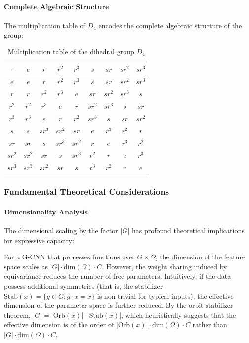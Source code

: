 \paragraph{Complete Algebraic Structure}

The multiplication table of $D_4$ encodes the complete algebraic structure of the group:

\begin{table}[h]
\centering
\small
\begin{tabular}{|c|c|c|c|c|c|c|c|c|}
\hline
$\cdot$ & $e$ & $r$ & $r^2$ & $r^3$ & $s$ & $sr$ & $sr^2$ & $sr^3$ \\
\hline
$e$ & $e$ & $r$ & $r^2$ & $r^3$ & $s$ & $sr$ & $sr^2$ & $sr^3$ \\
$r$ & $r$ & $r^2$ & $r^3$ & $e$ & $sr$ & $sr^2$ & $sr^3$ & $s$ \\
$r^2$ & $r^2$ & $r^3$ & $e$ & $r$ & $sr^2$ & $sr^3$ & $s$ & $sr$ \\
$r^3$ & $r^3$ & $e$ & $r$ & $r^2$ & $sr^3$ & $s$ & $sr$ & $sr^2$ \\
$s$ & $s$ & $sr^3$ & $sr^2$ & $sr$ & $e$ & $r^3$ & $r^2$ & $r$ \\
$sr$ & $sr$ & $s$ & $sr^3$ & $sr^2$ & $r$ & $e$ & $r^3$ & $r^2$ \\
$sr^2$ & $sr^2$ & $sr$ & $s$ & $sr^3$ & $r^2$ & $r$ & $e$ & $r^3$ \\
$sr^3$ & $sr^3$ & $sr^2$ & $sr$ & $s$ & $r^3$ & $r^2$ & $r$ & $e$ \\
\hline
\end{tabular}
\caption{Multiplication table of the dihedral group $D_4$}
\label{tab:d4_multiplication}
\end{table}

\subsubsection{Fundamental Theoretical Considerations}

\paragraph{Dimensionality Analysis}

The dimensional scaling by the factor $|G|$ has profound theoretical implications for expressive capacity:

\begin{remark}\label{thm:tradeoff_dimensional}
For a G-CNN that processes functions over $G \times \Omega$, the dimension of the feature space scales as $|G| \cdot \text{dim}(\Omega) \cdot C$. However, the weight sharing induced by equivariance reduces the number of free parameters. Intuitively, if the data possess additional symmetries (that is, the stabilizer $\text{Stab}(x) = \{g \in G : g \cdot x = x\}$ is non-trivial for typical inputs), the effective dimension of the parameter space is further reduced. By the orbit-stabilizer theorem, $|G| = |\text{Orb}(x)| \cdot |\text{Stab}(x)|$, which heuristically suggests that the effective dimension is of the order of $|\text{Orb}(x)| \cdot \text{dim}(\Omega) \cdot C$ rather than $|G| \cdot \text{dim}(\Omega) \cdot C$.
\end{remark}


